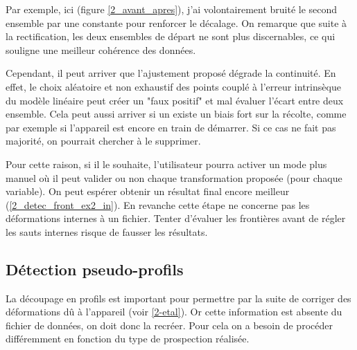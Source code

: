 \documentclass[12pt]{article}
\begin{document}
    Par exemple, ici (figure \ref{2_avant_apres}), j'ai volontairement bruité le second ensemble par une constante pour renforcer le décalage. On remarque que suite à la rectification, les deux ensembles de départ ne sont plus discernables, ce qui souligne une meilleur cohérence des données.

    Cependant, il peut arriver que l'ajustement proposé dégrade la continuité. En effet, le choix aléatoire et non exhaustif des points couplé à l'erreur intrinsèque du modèle linéaire peut créer un "faux positif" et mal évaluer l'écart entre deux ensemble. Cela peut aussi arriver si un existe un biais fort sur la récolte, comme par exemple si l'appareil est encore en train de démarrer. Si ce cas ne fait pas majorité, on pourrait chercher à le supprimer.
    
    \label{2_detec_front_ex2_out} Pour cette raison, si il le souhaite, l'utilisateur pourra activer un mode plus manuel où il peut valider ou non chaque transformation proposée (pour chaque variable). On peut espérer obtenir un résultat final encore meilleur (\ref{2_detec_front_ex2_in}). En revanche cette étape ne concerne pas les déformations internes à un fichier. Tenter d'évaluer les frontières avant de régler les sauts internes risque de fausser les résultats.

\newpage
\subsection{Détection pseudo-profils}

    La découpage en profils est important pour permettre par la suite de corriger des déformations dû à l'appareil (voir \ref{2-etal}). Or cette information est absente du fichier de données, on doit donc la recréer. Pour cela on a besoin de procéder différemment en fonction du type de prospection réalisée.
\end{document}
